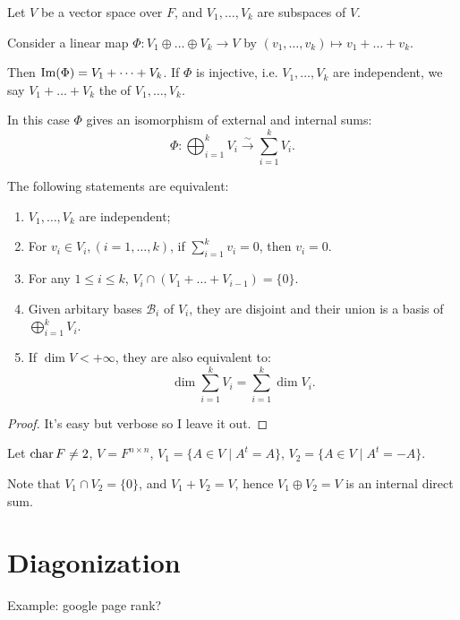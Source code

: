 \begin{remark}
    Let $V$ be a vector space over $F$, and $V_1,\dots,V_k$ are subspaces of $V$.

	Consider a linear map  $\Phi: V_1\oplus \dots\oplus V_k\to V$ by
	$(v_1,\dots,v_k)\mapsto v_1+\dots+v_k$.

	Then $\operatorname{Im}(\Phi) = V_1+\dots+V_k$.
	If $\Phi$ is injective, i.e.  $V_1,\dots,V_k$ are independent, we say
	$V_1+\dots+V_k$ the  of  $V_1,\dots,V_k$.

	In this case $\Phi$ gives an isomorphism of external and internal sums:
	\[
		\Phi: \bigoplus_{i=1}^k V_i \xrightarrow{\sim} \sum_{i=1}^k V_i.
	\]
\end{remark}

\begin{lemma}
	The following statements are equivalent:
	\begin{enumerate}
		\item $V_1,\dots, V_k$ are independent;
		\item For $v_i\in V_i, (i=1,\dots,k)$, if $\sum_{i=1}^kv_i =0$, then  $v_i=0$.
		\item For any  $1\le i\le k$,  $V_i\cap (V_1+\dots+V_{i-1})=\{0\}$.
		\item Given arbitary bases  $\mathcal{B}_i$ of $V_i$,
			they are disjoint and their union is a basis of $\bigoplus_{i=1}^k V_i$.
		\item If $\dim V<+\infty$, they are also equivalent to:
		\[
			\dim \sum_{i=1}^{k} V_i = \sum_{i=1}^{k} \dim V_i.
		\]
	\end{enumerate}
\end{lemma}

\begin{proof}[Proof]
    It's easy but verbose so I leave it out.
\end{proof}

\begin{example}
	Let $\operatorname{char} F \ne 2$,  $V=F^{n \times n}$, $V_1 = \{A\in V\mid A^t=A\}$,
	$V_2 = \{A\in V\mid A^t = -A\}$.

	Note that $V_1\cap V_2 = \{0\}$, and $V_1+V_2 = V$,
	hence $V_1\oplus V_2=V$ is an internal direct sum.
\end{example}

\section{Diagonization}
\label{sec:Diagonalization}

Example: google page rank?

